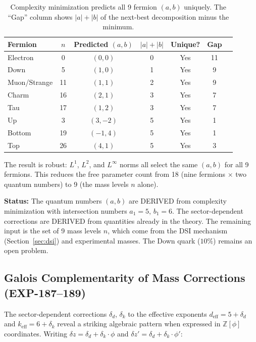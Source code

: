 \documentclass[12pt,a4paper]{article}
\begin{document}
\begin{table}[H]
\centering
\begin{tabular}{lcccccc}
\toprule
\textbf{Fermion} & $n$ & \textbf{Predicted} $(a,b)$ & $|a|+|b|$ & \textbf{Unique?} & \textbf{Gap} \\
\midrule
Electron & 0 & $(0,0)$ & 0 & Yes & 11 \\
Down & 5 & $(1,0)$ & 1 & Yes & 9 \\
Muon/Strange & 11 & $(1,1)$ & 2 & Yes & 9 \\
Charm & 16 & $(2,1)$ & 3 & Yes & 7 \\
Tau & 17 & $(1,2)$ & 3 & Yes & 7 \\
Up & 3 & $(3,-2)$ & 5 & Yes & 1 \\
Bottom & 19 & $(-1,4)$ & 5 & Yes & 1 \\
Top & 26 & $(4,1)$ & 5 & Yes & 3 \\
\bottomrule
\end{tabular}
\caption{Complexity minimization predicts all 9 fermion $(a,b)$ uniquely. The ``Gap'' column shows $|a|+|b|$ of the next-best decomposition minus the minimum.}
\label{tab:complexity}
\end{table}

The result is robust: $L^1$, $L^2$, and $L^\infty$ norms all select the same $(a,b)$ for all 9 fermions. This reduces the free parameter count from 18 (nine fermions $\times$ two quantum numbers) to 9 (the mass levels $n$ alone).

\textbf{Status:} The quantum numbers $(a,b)$ are DERIVED from complexity minimization with intersection numbers $a_1 = 5$, $b_1 = 6$. The sector-dependent corrections are DERIVED from quantities already in the theory. The remaining input is the set of 9 mass levels $n$, which come from the DSI mechanism (Section~\ref{sec:dsi}) and experimental masses. The Down quark ($10\%$) remains an open problem.

\subsection{Galois Complementarity of Mass Corrections (EXP-187--189)}
\label{sec:galois_complementarity}

The sector-dependent corrections $\delta_d$, $\delta_k$ to the effective exponents $d_{\text{eff}} = 5 + \delta_d$ and $k_{\text{eff}} = 6 + \delta_k$ reveal a striking algebraic pattern when expressed in $\mathbb{Z}[\phi]$ coordinates. Writing $\delta z = \delta_d + \delta_k \cdot \phi$ and $\delta z' = \delta_d + \delta_k \cdot \phi'$:
\end{document}
